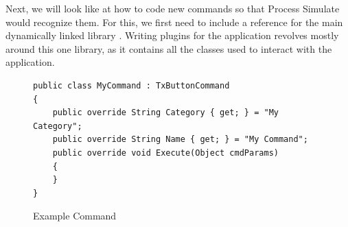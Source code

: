 Next, we will look like at how to code new commands so that Process Simulate would recognize them. 
For this, we first need to include a reference for the main dynamically linked library . 
Writing plugins for the application revolves mostly around this one library, as it contains all the classes used to interact with the application.

\begin{figure}[H]
    \caption{Example Command}
    \centering
    \begin{verbatim}
public class MyCommand : TxButtonCommand
{
    public override String Category { get; } = "My Category";
    public override String Name { get; } = "My Command";
    public override void Execute(Object cmdParams)
    {
    }
}
    \end{verbatim}
    \label{fig:CodeCommand}
\end{figure}
